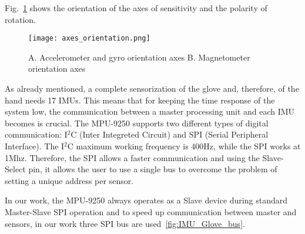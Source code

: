 Fig.~\ref{fig:axes} shows the orientation of the axes of sensitivity and the polarity of rotation.
\begin{figure}[h]
\centering
\texttt{[image: axes\_orientation.png]}
\caption{A. Accelerometer and gyro orientation axes  B. Magnetometer orientation axes}
\label{fig:axes}
\end{figure}

As already mentioned, a complete sensorization of the glove and, therefore, of the hand needs 17 IMUs. This means that for keeping the time response of the system low, the communication between a master processing unit and each IMU becomes is crucial. The MPU-9250 supports two different types of digital communication: I$^2$C (Inter Integreted Circuit) and SPI (Serial Peripheral Interface). The I$^2$C maximum working frequency is 400Hz, while the SPI works at 1Mhz. Therefore, the SPI allows a faster communication and using the Slave-Select pin, it allows the user to use a single bus to overcome the problem of setting a unique address per sensor.



In our work, the MPU-9250 always operates as a Slave device during standard Master-Slave SPI operation and to speed up communication between master and sensors, in our work three SPI bus are used~\ref{fig:IMU_Glove_bus}.

